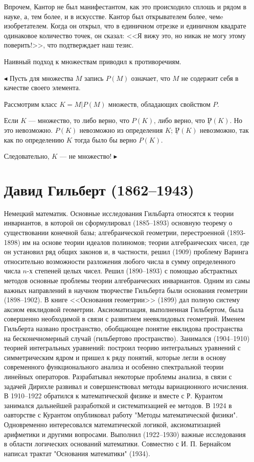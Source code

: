 \documentclass[a4paper,14pt]{extreport}
\begin{document}
Впрочем, Кантор не был манифестантом, как это происходило сплошь и рядом в науке, а, тем более, и в искусстве.
Кантор был открывателем более, чемe изобретателем. Когда он открыл, что в единичном отрезке и единичном квадрате одинаковое количество точек, он сказал: <<Я вижу это, но никак не могу этому поверить!>>, что подтверждает наш тезис.

Наивный подход к множествам приводил к противоречиям.

$\blacktriangleleft$ Пусть для множества $M$ запись $P(M)$ означает, что $M$ не содержит себя в качестве своего элемента.

Рассмотрим класс $K={M|P(M)}$ множеств, обладающих свойством $P$.

Если $K$ --- множество, то либо верно, что $P(K)$, либо верно, что $\not P(K)$. Но это невозможно. $P(K)$ невозможно из определения $K$; $\not P(K)$ невозможно, так как по определению $K$ тогда было бы верно $P(K)$.

Следовательно, $K$ --- не множество! $\blacktriangleright$



\section{Давид Гильберт (1862--1943)}\label{gilbert}

Немецкий математик. Основные исследования Гильбарта относятся к теории инвариантов, в которой он сформулировал (1885--1893) основную теорему о существовании конечной базы; алгебраической геометрии, перестроенной (1893-1898) им на основе теории идеалов полиномов; теории алгебраических чисел, где он установил ряд общих законов и, в частности, решил (1909) проблему Варинга относительно возможности разложения любого числа в сумму определенного числа $n$-х степеней целых чисел. Решил (1890--1893) с помощью абстрактных методов основные проблемы теории алгебраических инвариантов. Одним из самы важных направлений в научном творчестве Гильберта были основания геометрии (1898--1902). В книге <<Основания геометрии>> (1899) дал полную систему аксиом евклидовой геометрии. Аксиоматизация, выполненная Гильбертом, была совершенно необходимой в связи с развитием неевклидовых геометрий. Именем Гильберта названо пространство, обобщающее понятие евклидова пространства на бесконечномерный случай (гильбертово пространство). Занимался (1904--1910) теорией интегральных уравнений: построил теорию интегральных уравнений с симметрическим ядром и пришел к ряду понятий, которые легли в основу современного функционального анализа и особенно спектральной теории линейных операторов. Разрабатывал некоторые проблемы анализа, в связи с задачей Дирихле развивал и совершенствовал методы вариационного исчисления. В 1910--1922 обратился к математической физике и вместе с Р. Курантом занимался дальнейшей разработкой и систематизацией ее методов. В 1924 в оавторстве с Курантом опубликовал работу "Методы математической физики". Одновременно интересовался математической логикой, аксиоматизацией арифметики и другими вопросами. Выполнил (1922--1930) важные исследования в области логических оснований математики. Совместно с И. П. Бернайсом написал трактат "Основания математики" (1934).
\end{document}
